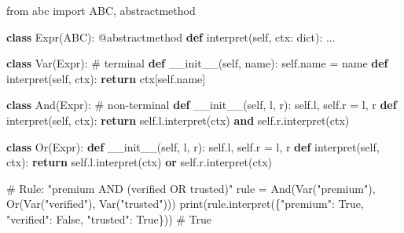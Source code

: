 \documentclass[11pt]{article}
\newenvironment{Shaded}{\begin{snugshade}}{\end{snugshade}}
\newcommand{\AttributeTok}[1]{\textcolor[rgb]{0.16,0.50,0.73}{#1}}
\newcommand{\BuiltInTok}[1]{\textcolor[rgb]{0.50,0.55,0.55}{#1}}
\newcommand{\CommentTok}[1]{\textcolor[rgb]{0.48,0.49,0.49}{#1}}
\newcommand{\ControlFlowTok}[1]{\textcolor[rgb]{0.99,0.74,0.29}{\textbf{#1}}}
\newcommand{\FunctionTok}[1]{\textcolor[rgb]{0.56,0.27,0.68}{#1}}
\newcommand{\ImportTok}[1]{\textcolor[rgb]{0.15,0.68,0.38}{#1}}
\newcommand{\KeywordTok}[1]{\textcolor[rgb]{0.81,0.81,0.76}{\textbf{#1}}}
\newcommand{\NormalTok}[1]{\textcolor[rgb]{0.81,0.81,0.76}{#1}}
\newcommand{\OperatorTok}[1]{\textcolor[rgb]{0.81,0.81,0.76}{#1}}
\newcommand{\StringTok}[1]{\textcolor[rgb]{0.96,0.31,0.31}{#1}}
\newcommand{\VariableTok}[1]{\textcolor[rgb]{0.15,0.68,0.68}{#1}}
\begin{document}
\begin{Shaded}
\begin{Highlighting}[]
\ImportTok{from}\NormalTok{ abc }\ImportTok{import}\NormalTok{ ABC, abstractmethod}

\KeywordTok{class}\NormalTok{ Expr(ABC):}
    \AttributeTok{@abstractmethod}
    \KeywordTok{def}\NormalTok{ interpret(}\VariableTok{self}\NormalTok{, ctx: }\BuiltInTok{dict}\NormalTok{): ...}

\KeywordTok{class}\NormalTok{ Var(Expr):                              }\CommentTok{\# terminal}
    \KeywordTok{def} \FunctionTok{\_\_init\_\_}\NormalTok{(}\VariableTok{self}\NormalTok{, name): }\VariableTok{self}\NormalTok{.name }\OperatorTok{=}\NormalTok{ name}
    \KeywordTok{def}\NormalTok{ interpret(}\VariableTok{self}\NormalTok{, ctx): }\ControlFlowTok{return}\NormalTok{ ctx[}\VariableTok{self}\NormalTok{.name]}

\KeywordTok{class}\NormalTok{ And(Expr):                              }\CommentTok{\# non{-}terminal}
    \KeywordTok{def} \FunctionTok{\_\_init\_\_}\NormalTok{(}\VariableTok{self}\NormalTok{, l, r): }\VariableTok{self}\NormalTok{.l, }\VariableTok{self}\NormalTok{.r }\OperatorTok{=}\NormalTok{ l, r}
    \KeywordTok{def}\NormalTok{ interpret(}\VariableTok{self}\NormalTok{, ctx): }\ControlFlowTok{return} \VariableTok{self}\NormalTok{.l.interpret(ctx) }\KeywordTok{and} \VariableTok{self}\NormalTok{.r.interpret(ctx)}

\KeywordTok{class}\NormalTok{ Or(Expr):}
    \KeywordTok{def} \FunctionTok{\_\_init\_\_}\NormalTok{(}\VariableTok{self}\NormalTok{, l, r): }\VariableTok{self}\NormalTok{.l, }\VariableTok{self}\NormalTok{.r }\OperatorTok{=}\NormalTok{ l, r}
    \KeywordTok{def}\NormalTok{ interpret(}\VariableTok{self}\NormalTok{, ctx): }\ControlFlowTok{return} \VariableTok{self}\NormalTok{.l.interpret(ctx) }\KeywordTok{or} \VariableTok{self}\NormalTok{.r.interpret(ctx)}

\CommentTok{\# Rule: "premium AND (verified OR trusted)"}
\NormalTok{rule }\OperatorTok{=}\NormalTok{ And(Var(}\StringTok{"premium"}\NormalTok{), Or(Var(}\StringTok{"verified"}\NormalTok{), Var(}\StringTok{"trusted"}\NormalTok{)))}
\BuiltInTok{print}\NormalTok{(rule.interpret(\{}\StringTok{"premium"}\NormalTok{: }\VariableTok{True}\NormalTok{, }\StringTok{"verified"}\NormalTok{: }\VariableTok{False}\NormalTok{, }\StringTok{"trusted"}\NormalTok{: }\VariableTok{True}\NormalTok{\}))  }\CommentTok{\# True}
\end{Highlighting}
\end{Shaded}
\end{document}
